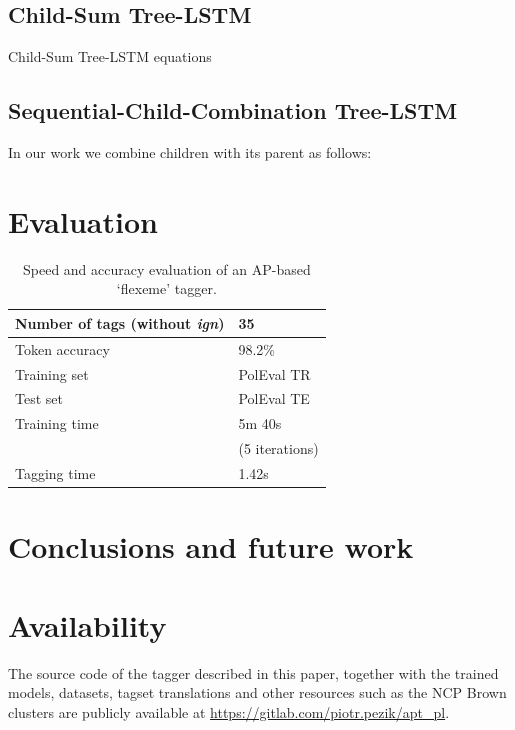 \documentclass[10pt, a4paper]{article}
\begin{document}
\subsection{Child-Sum Tree-LSTM}
        Child-Sum Tree-LSTM equations
	
\subsection{Sequential-Child-Combination Tree-LSTM}
	In our work we combine children with its parent as follows:
	
\section{Evaluation} 

\begin{table}[h]
 \begin{center}
\begin{tabular}{|l|l|}

      \hline
      Number of tags (without \textit{ign}) & 35\\
      \hline
      Token accuracy & 98.2\%\\
      \hline
      Training set & PolEval TR\\
      \hline
      Test set & PolEval TE\\
           \hline
      Training time & 5m 40s \\
      &(5 iterations)\\
      \hline
      Tagging time & 1.42s\\
 
      \hline
\end{tabular}
\caption{Speed and accuracy evaluation of an AP-based `flexeme' tagger.}
\label{tab:main_tags}
 \end{center}
\end{table}



\section{Conclusions and future work}


\section{Availability}

The source code of the tagger described in this paper, together with the trained models, datasets, tagset translations and other resources such as the NCP Brown clusters are publicly available at \url{https://gitlab.com/piotr.pezik/apt_pl}.



 
\end{document}
